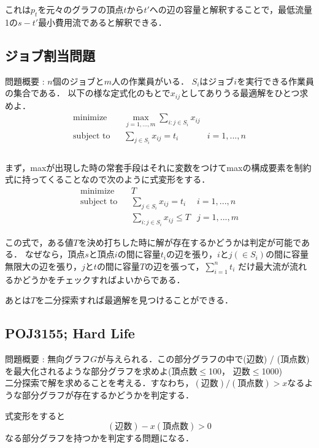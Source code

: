 \documentclass[13pt, a4paper, landscape]{jarticle}
\theoremstyle{nonitalic} %
\begin{document}
これは$p_t$を元々のグラフの頂点$t$から$t'$への辺の容量と解釈することで，最低流量1の$s-t'$最小費用流であると解釈できる．

\subsection{ジョブ割当問題}
問題概要 : $n$個のジョブと$m$人の作業員がいる．
$S_i$はジョブ$i$を実行できる作業員の集合である．
以下の様な定式化のもとで$x_{ij}$としてありうる最適解をひとつ求めよ．
\begin{align}
  &&&&& \textrm{minimize}   && \max_{j=1,...,m} \sum_{i:j \in S_i} x_{ij} \\
  &&&&& \textrm{subject to} && \sum_{j \in S_i} x_{ij} = t_i  & i=1,...,n &&&&&\\
\end{align}\\


まず，maxが出現した時の常套手段はそれに変数をつけてmaxの構成要素を制約式に持ってくることなので次のように式変形をする．
\begin{align}
  &&&&& \textrm{minimize}   && T \\
  &&&&& \textrm{subject to} && \sum_{j \in S_i} x_{ij} = t_i  & i=1,...,n &&&&&\\
  &&&&&                     &&  \sum_{i:j \in S_i} x_{ij} \leq T & j=1,...,m
\end{align}

この式で，ある値$T$を決め打ちした時に解が存在するかどうかは判定が可能である． なぜなら，頂点$s$と頂点$i$の間に容量$t_i$の辺を張り，$i$と$j (\in S_i)$の間に容量無限大の辺を張り，$j$と$t$の間に容量$T$の辺を張って，$\sum_{i=1}^n t_i $ だけ最大流が流れるかどうかをチェックすればよいからである．

あとは$T$を二分探索すれば最適解を見つけることができる．


\subsection{POJ3155; Hard Life}
問題概要 : 無向グラフ$G$が与えられる．この部分グラフの中で(辺数) / (頂点数)を最大化されるような部分グラフを求めよ(頂点数$\leq$100， 辺数$\leq$1000)\\

二分探索で解を求めることを考える．すなわち，$ (\textrm{辺数}) / (\textrm{頂点数})  > x$なるような部分グラフが存在するかどうかを判定する．

式変形をすると
\begin{equation}
  (\textrm{辺数}) - x (\textrm{頂点数}) > 0 \label{ineqHardLife}
\end{equation}
なる部分グラフを持つかを判定する問題になる．
\end{document}
